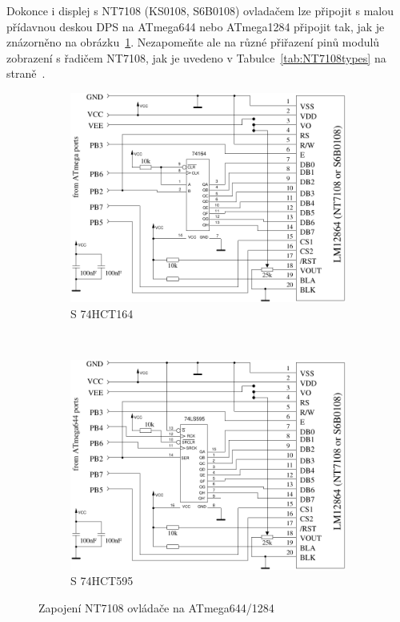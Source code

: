 Dokonce i displej s NT7108 (KS0108, S6B0108) ovladačem lze připojit s malou přídavnou deskou DPS na
ATmega644 nebo ATmega1284 připojit tak, jak je znázorněno na obrázku~\ref{fig:NT7108lcd_644}.
Nezapomeňte ale na různé přiřazení pinů modulů zobrazení s řadičem NT7108, jak je uvedeno v
Tabulce~\ref{tab:NT7108types} na straně~\pageref{tab:NT7108types}.

\begin{figure}[H]
  \begin{subfigure}[b]{.5\textwidth}
    \centering
    \includegraphics[width=.88\textwidth]{../FIG/ST7108serial164_644.pdf}
    \caption{S 74HCT164}
  \end{subfigure}
  ~
  \begin{subfigure}[b]{.5\textwidth}
    \centering
    \includegraphics[width=.88\textwidth]{../FIG/ST7108serial595_644.pdf}
    \caption{S 74HCT595}
  \end{subfigure}
  \caption{Zapojení NT7108 ovládače na ATmega644/1284}
  \label{fig:NT7108lcd_644}
\end{figure}


